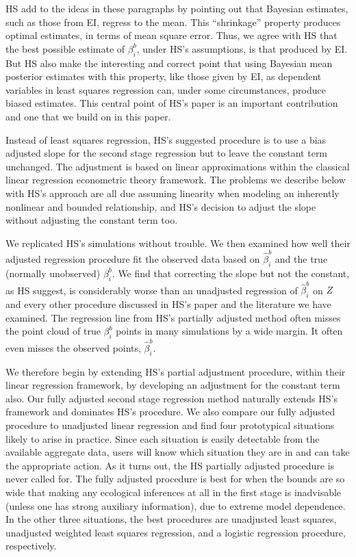 \documentclass[11pt,titlepage]{article}
\begin{document}
HS add to the ideas in these paragraphs by pointing out that Bayesian
estimates, such as those from EI, regress to the mean.  This
``shrinkage'' property produces optimal estimates, in terms of mean
square error.  Thus, we agree with HS that the best possible estimate
of $\beta^b_i$, under HS's assumptions, is that produced by EI.  But
HS also make the interesting and correct point that using Bayesian
mean posterior estimates with this property, like those given by EI,
as dependent variables in least squares regression can, under some
circumstances, produce biased estimates.  This central
point of HS's paper is an important contribution and one that we build
on in this paper.

Instead of least squares regression, HS's suggested procedure is to
use a bias adjusted slope for the second stage regression but to leave
the constant term unchanged.  The adjustment is based on linear
approximations within the classical linear regression econometric
theory framework.  The problems we describe below with HS's approach
are all due assuming linearity when modeling an inherently nonlinear
and bounded relationship, and HS's decision to adjust the slope without
adjusting the constant term too.

We replicated HS's simulations without trouble.  We then examined how
well their adjusted regression procedure fit the observed data based
on $\hat\beta_i^b$ and the true (normally unobserved) $\beta_i^b$.  We
find that correcting the slope but not the constant, as HS suggest, is
considerably worse than an unadjusted regression of $\hat\beta_i^b$ on
$Z$ and every other procedure discussed in HS's paper and the
literature we have examined.  The regression line from HS's partially
adjusted method often misses the point cloud of true $\beta_i^b$
points in many simulations by a wide margin.  It often even misses
the observed points, $\hat\beta_i^b$.

We therefore begin by extending HS's partial adjustment procedure,
within their linear regression framework, by developing an adjustment
for the constant term also.  Our fully adjusted second stage
regression method naturally extends HS's framework and dominates HS's
procedure.  We also compare our fully adjusted procedure to unadjusted
linear regression and find four prototypical situations likely to
arise in practice.  Since each situation is easily detectable from the
available aggregate data, users will know which situation they are in
and can take the appropriate action.  As it turns out, the HS
partially adjusted procedure is never called for.  The fully adjusted
procedure is best for when the bounds are so wide that making any
ecological inferences at all in the first stage is inadvisable (unless
one has strong auxiliary information), due to extreme model
dependence.  In the other three situations, the best procedures are
unadjusted least squares, unadjusted weighted least squares
regression, and a logistic regression procedure, respectively.
\end{document}
